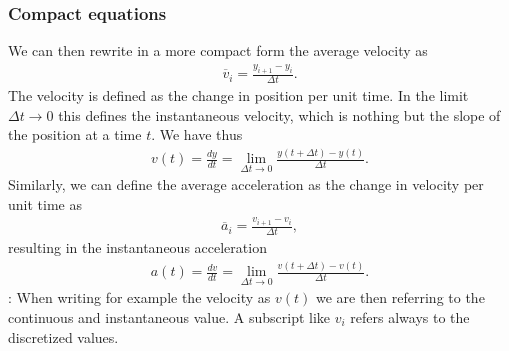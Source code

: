 \documentclass[letterpaper,10pt,english]{sphinxmanual}
\begin{document}
\subsubsection{Compact equations}
\label{\detokenize{chapter2:compact-equations}}
We can then rewrite in a more compact form the average velocity as
\begin{equation*}
\begin{split}
\overline{v}_i = \frac{y_{i+1}-y_{i}}{\Delta t}.
\end{split}
\end{equation*}
The velocity is defined as the change in position per unit time.
In the limit \(\Delta t \rightarrow 0\) this defines the instantaneous velocity, which is nothing but the slope of the position at a time \(t\).
We have thus
\begin{equation*}
\begin{split}
v(t) = \frac{dy}{dt}=\lim_{\Delta t \rightarrow 0}\frac{y(t+\Delta t)-y(t)}{\Delta t}.
\end{split}
\end{equation*}
Similarly, we can define the average acceleration as the change in velocity per unit time as
\begin{equation*}
\begin{split}
\overline{a}_i = \frac{v_{i+1}-v_{i}}{\Delta t},
\end{split}
\end{equation*}
resulting in the instantaneous acceleration
\begin{equation*}
\begin{split}
a(t) = \frac{dv}{dt}=\lim_{\Delta t\rightarrow 0}\frac{v(t+\Delta t)-v(t)}{\Delta t}.
\end{split}
\end{equation*}
: When writing for example the velocity as \(v(t)\) we are then referring to the continuous and instantaneous value. A subscript like
\(v_i\) refers always to the discretized values.
\end{document}

